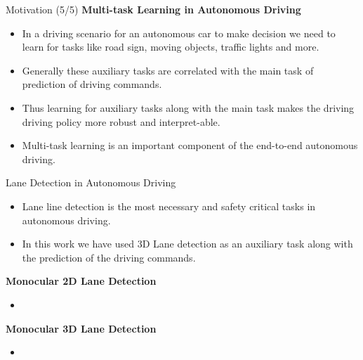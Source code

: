 \documentclass[aspectratio=169]{beamer}
\begin{document}
\begin{frame}{Motivation (5/5)}
\textbf{Multi-task Learning in Autonomous Driving}
   \begin{itemize}
        \item In a driving scenario for an autonomous car to make decision we need to learn for tasks like road sign, moving objects, traffic lights and more.
        \item Generally these auxiliary tasks are correlated with the main task of prediction of driving commands.
       \item Thus learning for auxiliary tasks  along with the main task makes the driving driving policy more robust and interpret-able.
       \item Multi-task learning is an important component of the end-to-end autonomous driving.
   \end{itemize}
\end{frame}

\begin{frame}{Lane Detection in Autonomous Driving}
    \begin{itemize}
        \item Lane line detection is the most necessary and safety critical tasks in autonomous driving.
        \item In this work we have used 3D Lane detection as an auxiliary task along with the prediction of the driving commands.
    \end{itemize}
    
    \textbf{Monocular 2D Lane Detection}
    \begin{itemize}
        \item 
    \end{itemize}
    
    \textbf{Monocular 3D Lane Detection}
    \begin{itemize}
        \item 
    \end{itemize}
\end{frame}

\begin{frame}
\printbibliography
\end{frame}
\end{document}
